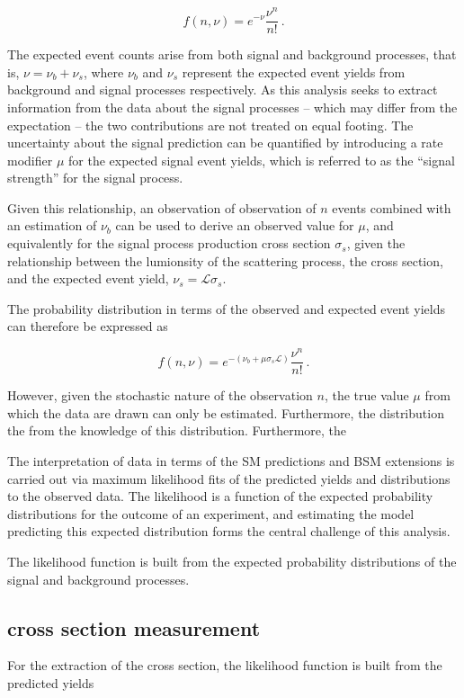 \begin{equation}
  f(n, \nu) = e^{-\nu}\frac{\nu^{n}}{n!} \,.
\end{equation}

The expected event counts arise from both signal and background
processes, that is, $\nu = \nu_{b} + \nu_{s}$, where $\nu_{b}$ and $\nu_s$
represent the expected event yields from background and signal processes
respectively. As this analysis seeks to extract information from the data about the signal
processes -- which may differ from the expectation --
the two contributions are not treated on equal footing. 
The uncertainty about the signal prediction can be quantified by 
introducing a rate modifier $\mu$ for the expected signal event yields, which
is referred to as the ``signal strength'' for the signal process.

Given this relationship, an observation of observation of $n$ events
combined with an estimation of $\nu_{b}$ can be used to derive an
observed value for $\mu$, and equivalently for the signal process
production cross section $\sigma_{s}$, given the relationship 
between the lumionsity of the scattering process, the cross section,
and the expected event yield, $\nu_s = \mathcal{L}\sigma_{s}$.

The probability distribution in terms of the 
observed and expected event yields can therefore be expressed as

\begin{equation}
  f(n, \nu) = e^{-(\nu_{b} + \mu\sigma_{s}\mathcal{L})}\frac{\nu^{n}}{n!} \,.
\end{equation}

However, given the stochastic nature of the observation $n$, the 
true value $\mu$ from which the data are drawn can only be estimated.
Furthermore, the distribution the 
from the knowledge of this distribution. Furthermore, the 

The interpretation of data in terms of the SM predictions and BSM extensions 
is carried out via maximum likelihood fits of the predicted yields and distributions
to the observed data.  
The likelihood is a function of the expected probability distributions for the
outcome of an experiment, and estimating the model predicting this expected 
distribution forms the central challenge of this analysis.

The likelihood function is built from the expected probability 
distributions of the signal and background processes.

\subsection{\WZjj cross section measurement}
For the extraction of the \WZjj cross section, the likelihood function is built
from the predicted yields 

